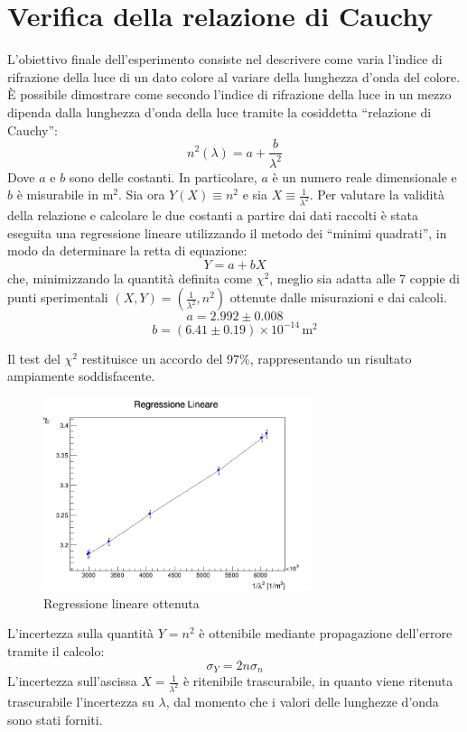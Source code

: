 \documentclass[a4paper,12pt]{article}
\begin{document}
\section{Verifica della relazione di Cauchy}
L’obiettivo finale dell’esperimento consiste nel descrivere come varia l’indice di rifrazione della luce di un dato colore al variare della lunghezza d’onda del colore. 
È possibile dimostrare come secondo l’indice di rifrazione della luce in un mezzo dipenda dalla lunghezza d’onda della luce tramite la cosiddetta “relazione di Cauchy”:
\[
n^2(\lambda) = a + \frac{b}{\lambda^2}
\]
Dove \( a \) e \( b \) sono delle costanti. In particolare, \( a \) è un numero reale dimensionale e \( b \) è misurabile in \( \text{m}^2 \). 
Sia ora \( Y(X) \equiv n^2 \) e sia \( X \equiv \frac{1}{\lambda^2} \).
Per valutare la validità della relazione e calcolare le due costanti a partire dai dati raccolti è stata eseguita una regressione lineare utilizzando il metodo dei “minimi quadrati”, in modo da determinare la retta di equazione:
\[
Y = a + bX
\]
che, minimizzando la quantità definita come \( \chi^2 \), meglio sia adatta alle 7 coppie di punti sperimentali \( (X, Y) = \left(\frac{1}{\lambda^2}, n^2\right) \) ottenute dalle misurazioni e dai calcoli.
\[
a = 2.992 \pm 0.008
\]
\[
b = (6.41 \pm 0.19) \times 10^{-14} \, \text{m}^2
\]

Il test del \( \chi^2 \) restituisce un accordo del \( 97 \% \), rappresentando un risultato ampiamente soddisfacente.

\begin{figure}[H]
    \centering
    \includegraphics[width=0.7\textwidth]{image.png}
    \caption{Regressione lineare ottenuta}
    \label{fig:regressione}
\end{figure}

L’incertezza sulla quantità \( Y = n^2 \) è ottenibile mediante propagazione dell’errore tramite il calcolo:
\[
\sigma_Y = 2n \sigma_n
\]
L’incertezza sull’ascissa \( X = \frac{1}{\lambda^2} \) è ritenibile trascurabile, in quanto viene ritenuta trascurabile l’incertezza su \( \lambda \), dal momento che i valori delle lunghezze d’onda sono stati forniti.
\end{document}
